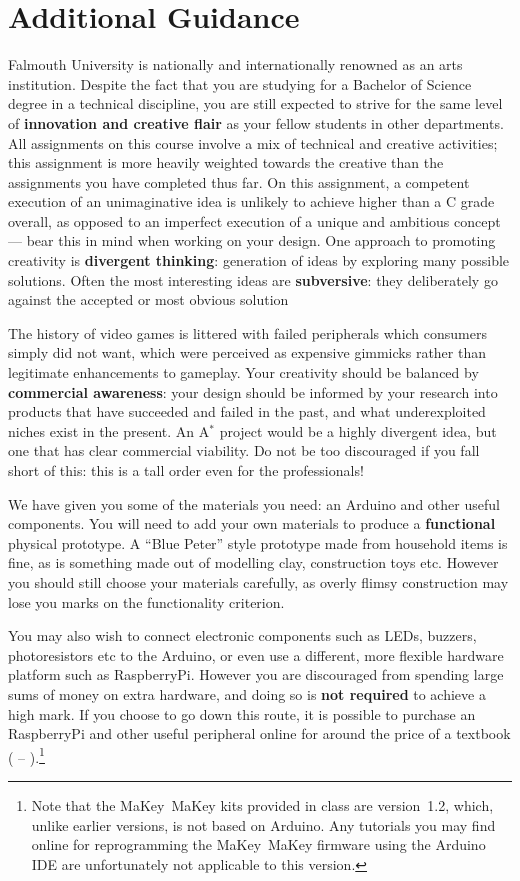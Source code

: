 \documentclass{../fal_assignment}
\begin{document}
\section*{Additional Guidance}

Falmouth University is nationally and internationally renowned as an arts institution.
Despite the fact that you are studying for a Bachelor of Science degree in a technical discipline,
you are still expected to strive for the same level of \textbf{innovation and creative flair}
as your fellow students in other departments.
All assignments on this course involve a mix of technical and creative activities;
this assignment is more heavily weighted towards the creative than the assignments you have completed thus far.
On this assignment, a competent execution of an unimaginative idea is unlikely to achieve higher than a C grade overall,
as opposed to an imperfect execution of a unique and ambitious concept
--- bear this in mind when working on your design.
One approach to promoting creativity is
\textbf{divergent thinking}: generation of ideas by exploring many possible solutions.
Often the most interesting ideas are \textbf{subversive}: they deliberately go against the
accepted or most obvious solution

The history of video games is littered with failed peripherals which consumers simply did not want,
which were perceived as expensive gimmicks rather than legitimate enhancements to gameplay.
Your creativity should be balanced by \textbf{commercial awareness}:
your design should be informed by your research into products that have succeeded and failed
in the past, and what underexploited niches exist in the present.
An A$^*$ project would be a highly divergent idea, but one that has clear commercial viability.
Do not be too discouraged if you fall short of this: this is a tall order even for the professionals!

We have given you some of the materials you need: an Arduino and other useful components.
You will need to add your own materials to produce a \textbf{functional} physical prototype.
A ``Blue Peter'' style prototype made from household items is fine,
as is something made out of modelling clay, construction toys etc.
However you should still choose your materials carefully, as overly flimsy construction may
lose you marks on the functionality criterion.

You may also wish to connect electronic components such as LEDs, buzzers, photoresistors etc to the Arduino,
or even use a different, more flexible hardware platform such as RaspberryPi.
However you are discouraged from spending large sums of money on extra hardware,
and doing so is \textbf{not required} to achieve a high mark.
If you choose to go down this route,
it is possible to purchase an RaspberryPi and other useful peripheral online for 
around the price of a textbook ( -- ).\footnote{
    Note that the MaKey~MaKey kits provided in class are version~1.2, which, unlike earlier versions, is not based on Arduino.
    Any tutorials you may find online for reprogramming the MaKey~MaKey firmware using the Arduino IDE
    are unfortunately not applicable to this version.
}
\end{document}
